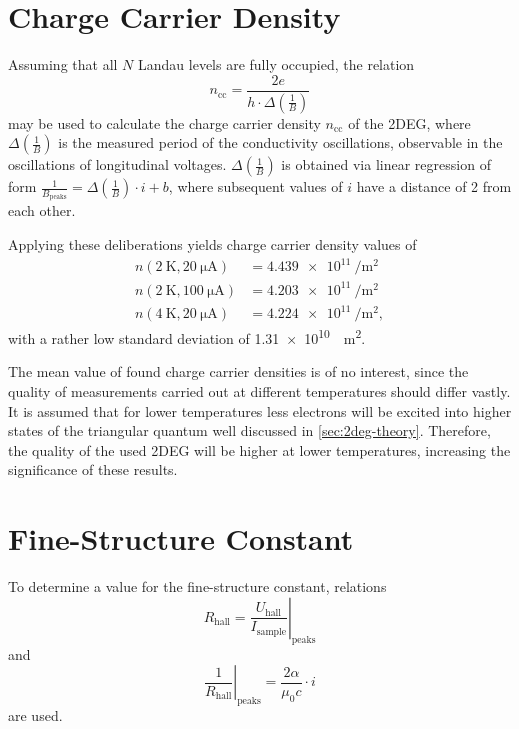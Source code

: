 \section{Charge Carrier Density}\label{sec:ccd} %
Assuming that all $N$ Landau levels are fully occupied, the relation
\begin{equation*}
	n_\text{cc} = \frac{2e}{h\cdot\Delta\left(\frac{1}{B}\right)}
\end{equation*}
may be used to calculate the charge carrier density $n_\text{cc}$ of the 2DEG, where $\Delta\left(\frac{1}{B}\right)$ is the measured period of the conductivity oscillations, observable in the oscillations of longitudinal voltages.
$\Delta\left(\frac{1}{B}\right)$ is obtained via linear regression of form $\frac{1}{B_\text{peaks}} = \Delta\left(\frac{1}{B}\right)\cdot i + b$, where subsequent values of $i$ have a distance of 2 from each other.

Applying these deliberations yields charge carrier density values of
\begin{align*}
	n\left(\SI{2}{\kelvin},\SI{20}{\micro\ampere}\right) &= \SI{4.439e11}{\per\meter\squared} \\
	n\left(\SI{2}{\kelvin},\SI{100}{\micro\ampere}\right) &= \SI{4.203e11}{\per\meter\squared} \\
	n\left(\SI{4}{\kelvin},\SI{20}{\micro\ampere}\right) &= \SI{4.224e11}{\per\meter\squared},
\end{align*}
with a rather low standard deviation of \SI{1.31e10}{\per\meter\squared}. %

The mean value of found charge carrier densities is of no interest, since the quality of measurements carried out at different temperatures should differ vastly.
It is assumed that for lower temperatures less electrons will be excited into higher states of the triangular quantum well discussed in \autoref{sec:2deg-theory}.
Therefore, the quality of the used 2DEG will be higher at lower temperatures, increasing the significance of these results.

\section{Fine-Structure Constant}\label{sec:fine} %
To determine a value for the fine-structure constant, relations
\begin{equation*}
	R_\text{hall} = \left. \frac{U_\text{hall}}{I_\text{sample}}\right\rvert_\text{peaks}
\end{equation*}
and
\begin{equation*}
	\left. \frac{1}{R_\text{hall}}\right\rvert_\text{peaks} = \frac{2\alpha}{\mu_0 c}\cdot i
\end{equation*}
are used.


